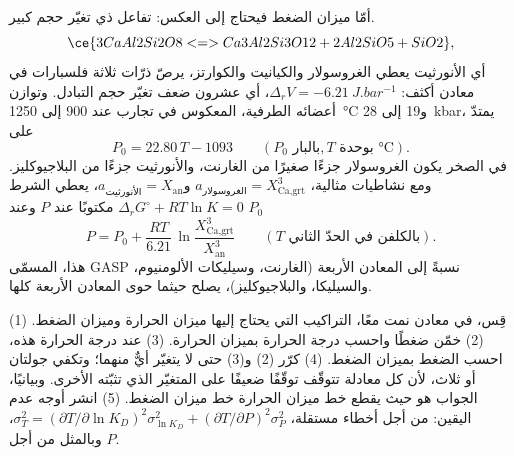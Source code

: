 أمّا ميزان الضغط فيحتاج إلى العكس: تفاعل ذي تغيّر حجم كبير. 
\[
\ce{3 CaAl2Si2O8 <=> Ca3Al2Si3O12 + 2 Al2SiO5 + SiO2},
\]
أي الأنورثيت يعطي الغروسولار والكيانيت والكوارتز، يرصّ ذرّات ثلاثة فلسبارات في
معادن أكثف: $\Delta_r V = \qty{-6.21}{J.bar^{-1}}$، أي عشرون ضعف تغيّر حجم التبادل.
وتوازن أعضائه الطرفية، المعكوس في تجارب عند 900 إلى \qty{1250}{\celsius} و19
إلى \qty{28}{kbar}، يمتدّ على
\[
P_0 = 22.80\,T - 1093 \qquad (P_0 \text{ بالبار}, T \text{ بوحدة } \unit{\celsius}).
\]
في الصخر يكون الغروسولار جزءًا صغيرًا من الغارنت، والأنورثيت جزءًا من
البلاجيوكليز. ومع نشاطيات مثالية، $a_{\text{الغروسولار}} = X_{\text{Ca,grt}}^3$
و$a_{\text{الأنورثيت}} = X_{\text{an}}$، يعطي الشرط $\Delta_r G^\circ + RT\ln K = 0$
مكتوبًا عند $P$ وعند $P_0$
\[
P = P_0 + \frac{RT}{6.21}\,\ln\frac{X_{\text{Ca,grt}}^3}{X_{\text{an}}^3}
\qquad (T \text{ بالكلفن في الحدّ الثاني}).
\]
 هذا، المسمّى GASP نسبةً إلى المعادن الأربعة (الغارنت، وسيليكات الألومنيوم، والسيليكا،
والبلاجيوكليز)، يصلح حيثما حوى  المعادن الأربعة كلها.

\begin{method}\label{met:b2:pt-paths:intersection}
(1) قِس، في معادن نمت معًا، التراكيب التي يحتاج إليها ميزان الحرارة
وميزان الضغط. (2) خمّن ضغطًا واحسب درجة الحرارة بميزان الحرارة.
(3) عند درجة الحرارة هذه، احسب الضغط بميزان الضغط. (4) كرّر (2) و(3)
حتى لا يتغيّر أيٌّ منهما؛ وتكفي جولتان أو ثلاث، لأن كل معادلة تتوقّف توقّفًا ضعيفًا على
المتغيّر الذي تثبّته الأخرى. وبيانيًا، الجواب هو حيث يقطع خط
ميزان الحرارة خط ميزان الضغط. (5) انشر أوجه عدم اليقين: من أجل
أخطاء مستقلة، $\sigma_T^2 = (\partial T/\partial\ln K_D)^2\sigma_{\ln K_D}^2 +
(\partial T/\partial P)^2\sigma_P^2$، وبالمثل من أجل $P$.
\end{method}

